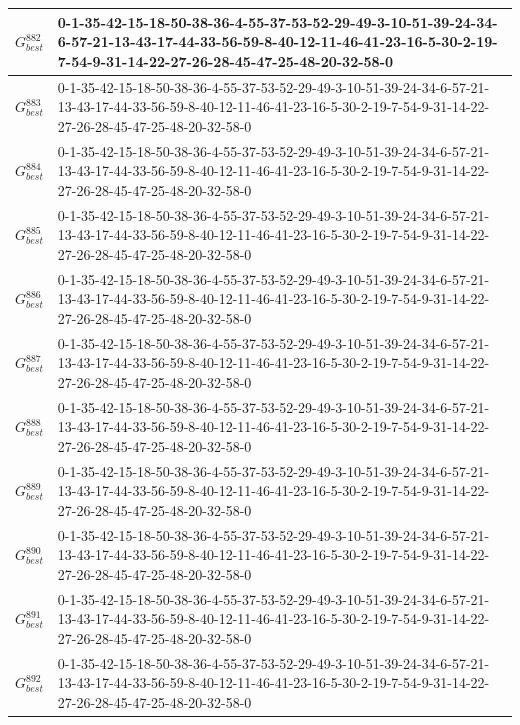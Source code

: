 \begin{landscape}
{\begin{tabularx}{\linewidth}{|c|X|}
        $G_{best}^{882}$ & 0-1-35-42-15-18-50-38-36-4-55-37-53-52-29-49-3-10-51-39-24-34-6-57-21-13-43-17-44-33-56-59-8-40-12-11-46-41-23-16-5-30-2-19-7-54-9-31-14-22-27-26-28-45-47-25-48-20-32-58-0 \\ \hline
        $G_{best}^{883}$ & 0-1-35-42-15-18-50-38-36-4-55-37-53-52-29-49-3-10-51-39-24-34-6-57-21-13-43-17-44-33-56-59-8-40-12-11-46-41-23-16-5-30-2-19-7-54-9-31-14-22-27-26-28-45-47-25-48-20-32-58-0 \\ \hline
        $G_{best}^{884}$ & 0-1-35-42-15-18-50-38-36-4-55-37-53-52-29-49-3-10-51-39-24-34-6-57-21-13-43-17-44-33-56-59-8-40-12-11-46-41-23-16-5-30-2-19-7-54-9-31-14-22-27-26-28-45-47-25-48-20-32-58-0 \\ \hline
        $G_{best}^{885}$ & 0-1-35-42-15-18-50-38-36-4-55-37-53-52-29-49-3-10-51-39-24-34-6-57-21-13-43-17-44-33-56-59-8-40-12-11-46-41-23-16-5-30-2-19-7-54-9-31-14-22-27-26-28-45-47-25-48-20-32-58-0 \\ \hline
        $G_{best}^{886}$ & 0-1-35-42-15-18-50-38-36-4-55-37-53-52-29-49-3-10-51-39-24-34-6-57-21-13-43-17-44-33-56-59-8-40-12-11-46-41-23-16-5-30-2-19-7-54-9-31-14-22-27-26-28-45-47-25-48-20-32-58-0 \\ \hline
        $G_{best}^{887}$ & 0-1-35-42-15-18-50-38-36-4-55-37-53-52-29-49-3-10-51-39-24-34-6-57-21-13-43-17-44-33-56-59-8-40-12-11-46-41-23-16-5-30-2-19-7-54-9-31-14-22-27-26-28-45-47-25-48-20-32-58-0 \\ \hline
        $G_{best}^{888}$ & 0-1-35-42-15-18-50-38-36-4-55-37-53-52-29-49-3-10-51-39-24-34-6-57-21-13-43-17-44-33-56-59-8-40-12-11-46-41-23-16-5-30-2-19-7-54-9-31-14-22-27-26-28-45-47-25-48-20-32-58-0 \\ \hline
        $G_{best}^{889}$ & 0-1-35-42-15-18-50-38-36-4-55-37-53-52-29-49-3-10-51-39-24-34-6-57-21-13-43-17-44-33-56-59-8-40-12-11-46-41-23-16-5-30-2-19-7-54-9-31-14-22-27-26-28-45-47-25-48-20-32-58-0 \\ \hline
        $G_{best}^{890}$ & 0-1-35-42-15-18-50-38-36-4-55-37-53-52-29-49-3-10-51-39-24-34-6-57-21-13-43-17-44-33-56-59-8-40-12-11-46-41-23-16-5-30-2-19-7-54-9-31-14-22-27-26-28-45-47-25-48-20-32-58-0 \\ \hline
        $G_{best}^{891}$ & 0-1-35-42-15-18-50-38-36-4-55-37-53-52-29-49-3-10-51-39-24-34-6-57-21-13-43-17-44-33-56-59-8-40-12-11-46-41-23-16-5-30-2-19-7-54-9-31-14-22-27-26-28-45-47-25-48-20-32-58-0 \\ \hline
        $G_{best}^{892}$ & 0-1-35-42-15-18-50-38-36-4-55-37-53-52-29-49-3-10-51-39-24-34-6-57-21-13-43-17-44-33-56-59-8-40-12-11-46-41-23-16-5-30-2-19-7-54-9-31-14-22-27-26-28-45-47-25-48-20-32-58-0 \\ \hline

\end{tabularx}}
\end{landscape}
